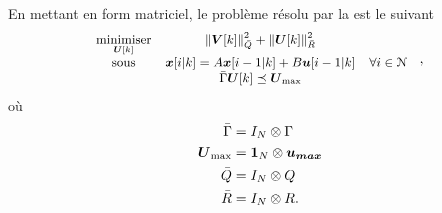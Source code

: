 \documentclass[../main.tex]{subfiles}
\begin{document}
En mettant en form matriciel, le problème résolu par la \mpc{} est le suivant
\begin{equation}
  \small
  \begin{aligned}
    \begin{matrix}
      \mathop{\textrm{minimiser}}\limits_{\boldsymbol{U}[k]} &\left\lVert\boldsymbol{V}[k]\right\rVert^{2}_{\bar{Q}} + \left\lVert\boldsymbol{U}[k] \right\rVert^{2}_{\bar{R}}&\\
      \mathrm{sous} &
      \boldsymbol{x}[i|k]=A\boldsymbol{x}[i-1|k]+B\boldsymbol{u}[i-1|k]
      &
       \forall i\in\mathcal{N} \\
      &\bar{\Gamma}\boldsymbol{U}[k]\preceq {\boldsymbol{U}}_{\text{max}}&

    \end{matrix}
  \end{aligned}
  \label{eq:general_qp}
  \quad,
\end{equation}
où
\begin{align}
  \label{eq:construction_Gamma_fr}
  \bar{\Gamma}&=I_{N}\otimes\Gamma\\
  \label{eq:construction_Umax_fr}
  \boldsymbol{U}_{\max}&=\mathbf{1}_{N}\otimes\boldsymbol{u_{max}}\\
  \bar{Q}&=I_{N}\otimes Q\\
  \bar{R}&=I_{N}\otimes R.
\end{align}
\end{document}
